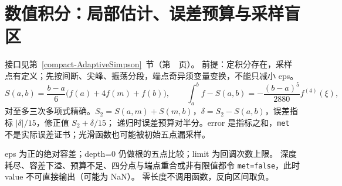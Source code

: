 \section{数值积分：局部估计、误差预算与采样盲区}\label{knowledge-adaptive-integration}
接口见第~\ref{compact-AdaptiveSimpson}~节（第~\pageref{compact-AdaptiveSimpson}~页）。
前提：定积分存在，采样点有定义；先按间断、尖峰、振荡分段，端点奇异须变量变换，不能只减小 eps。
\[
S(a,b)=\frac{b-a}{6}\bigl(f(a)+4f(m)+f(b)\bigr),\qquad
\int_a^bf-S(a,b)=-\frac{(b-a)^5}{2880}f^{(4)}(\xi),
\]
对至多三次多项式精确。$S_2=S(a,m)+S(m,b)$，$\delta=S_2-S(a,b)$，误差指标 $|\delta|/15$，修正值 $S_2+\delta/15$；
递归时误差预算对半分。error 是指标之和，\texttt{met} 不是实际误差证书；光滑函数也可能被初始五点漏采样。

eps 为正的绝对容差；depth=0 仍做根的五点比较；limit 为回调次数上限。
深度耗尽、容差下溢、预算不足、四分点与端点重合或非有限值都令 \texttt{met=false}，此时 value 不可直接输出（可能为 NaN）。
零长度不调用函数，反向区间取负。

